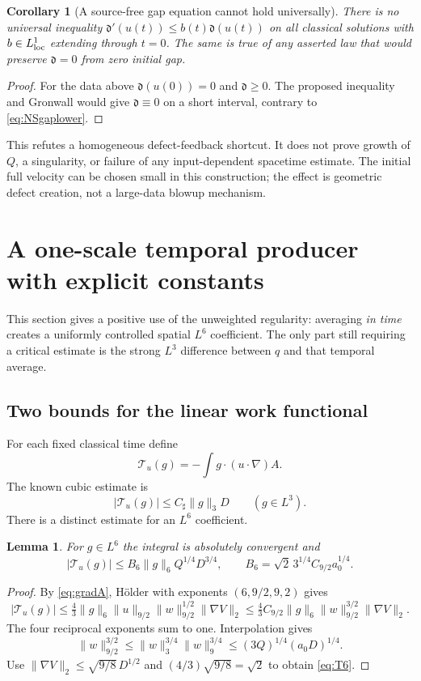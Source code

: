 \documentclass[11pt,a4paper]{article}
\newtheorem{lemma}[theorem]{Lemma}
\newtheorem{corollary}[theorem]{Corollary}
\theoremstyle{definition}\newtheorem{definition}[theorem]{Definition}
\theoremstyle{remark}\newtheorem{remark}[theorem]{Remark}
\newcommand{\norm}[1]{\lVert #1\rVert}
\numberwithin{equation}{section}
\begin{document}
\begin{corollary}[A source-free gap equation cannot hold universally]
There is no universal inequality
$\mathfrak d'(u(t))\le b(t)\mathfrak d(u(t))$ on all classical solutions with $b\in L^1_{\rm loc}$ extending through $t=0$. The same is true of any asserted law that would preserve $\mathfrak d=0$ from zero initial gap.
\end{corollary}
\begin{proof}
For the data above $\mathfrak d(u(0))=0$ and $\mathfrak d\ge0$. The proposed inequality and Gronwall would give $\mathfrak d\equiv0$ on a short interval, contrary to \eqref{eq:NSgaplower}.
\end{proof}
This refutes a homogeneous defect-feedback shortcut. It does not prove growth of $Q$, a singularity, or failure of any input-dependent spacetime estimate. The initial full velocity can be chosen small in this construction; the effect is geometric defect creation, not a large-data blowup mechanism.

\section{A one-scale temporal producer with explicit constants}
\label{sec:temporal}
This section gives a positive use of the unweighted regularity: averaging \emph{in time} creates a uniformly controlled spatial $L^6$ coefficient. The only part still requiring a critical estimate is the strong $L^3$ difference between $q$ and that temporal average.

\subsection{Two bounds for the linear work functional}
For each fixed classical time define
\[
 \mathcal T_u(g)=-\int g\cdot(u\cdot\nabla)A.
\]
The known cubic estimate is
\begin{equation}\label{eq:T3}
 |\mathcal T_u(g)|\le C_\sharp\norm g_3D\qquad(g\in L^3).
\end{equation}
There is a distinct estimate for an $L^6$ coefficient.
\begin{lemma}\label{lem:T6}
For $g\in L^6$ the integral is absolutely convergent and
\begin{equation}\label{eq:T6}
 |\mathcal T_u(g)|\le B_6\norm g_6 Q^{1/4}D^{3/4},
 \qquad B_6=\sqrt2\,3^{1/4}C_{9/2}a_0^{1/4}.
\end{equation}
\end{lemma}
\begin{proof}
By \eqref{eq:gradA}, H\"older with exponents $(6,9/2,9,2)$ gives
\[
 |\mathcal T_u(g)|
 \le\tfrac43\norm g_6\norm u_{9/2}
               \norm w_{9/2}^{1/2}\norm{\nabla V}_2
 \le\tfrac43 C_{9/2}\norm g_6\norm w_{9/2}^{3/2}\norm{\nabla V}_2.
\]
The four reciprocal exponents sum to one. Interpolation gives
\[
 \norm w_{9/2}^{3/2}
 \le\norm w_3^{3/4}\norm w_9^{3/4}
 \le(3Q)^{1/4}(a_0D)^{1/4}.
\]
Use $\norm{\nabla V}_2\le\sqrt{9/8}\,D^{1/2}$ and
$(4/3)\sqrt{9/8}=\sqrt2$ to obtain \eqref{eq:T6}.
\end{proof}
\end{document}
